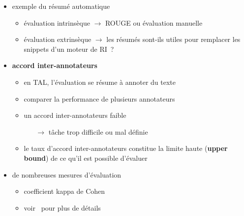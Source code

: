 \begin{frame}[allowframebreaks]
\begin{itemize}
    \item exemple du résumé automatique
    \begin{itemize}
        \item évaluation intrinsèque $\to$ ROUGE ou évaluation manuelle
        \item évaluation extrinsèque $\to$ les résumés sont-ils utiles pour 
              remplacer les snippets d'un moteur de RI~?
    \end{itemize}

    \framebreak

    \item \textbf{accord inter-annotateurs}
    \begin{itemize}
        \item en TAL, l'évaluation se résume à annoter du texte
        \item comparer la performance de plusieurs annotateurs
        \item un accord inter-annotateurs faible
        \begin{itemize}
            \item[$\to$] tâche trop difficile ou mal définie
        \end{itemize}
        \item le taux d'accord inter-annotateurs constitue la limite haute 
              (\textbf{upper bound}) de ce qu'il est possible d'évaluer
    \end{itemize}

    \item de nombreuses mesures d'évaluation
    \begin{itemize}
        \item coefficient kappa de Cohen
        \item voir~\cite{artstein2008inter} pour plus de détails
    \end{itemize}

\end{itemize}

\end{frame}


